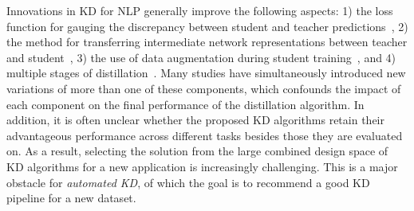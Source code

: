 \documentclass[11pt]{article}
\begin{document}
Innovations in KD for NLP generally improve the following aspects: 1) the loss function for gauging the discrepancy between student and teacher predictions~\citep{kim2021comparing}, 2) the method for transferring intermediate network representations between teacher and student~\citep{sun2019patient,li2020bert,yang2020knowledge}, 3) the use of data augmentation during student training~\citep{jiao2019tinybert}, and 4) multiple stages of  distillation~\citep{chen2020adabert,mirzadeh2020improved}. 
Many studies have simultaneously introduced new variations of more than one of these components, which confounds the impact of each component on the final performance of the distillation algorithm. In addition, it is often unclear whether the proposed KD algorithms retain their advantageous performance across different tasks besides those they are evaluated on. As a result, selecting the solution from the large combined design space of KD algorithms for a new application is increasingly challenging. This is a major obstacle for \emph{automated KD}, of which the goal is to recommend a good KD pipeline for a new dataset.
\end{document}

